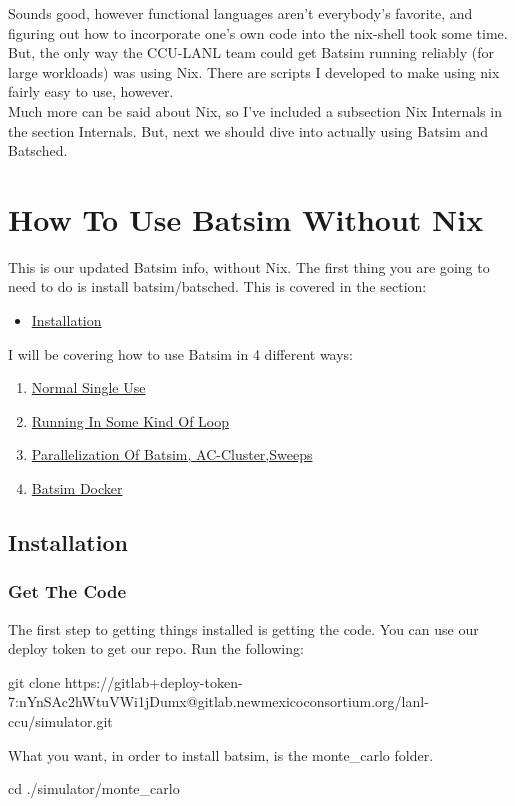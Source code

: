 \documentclass[titlepage]{article}
\let\oldsection\section
\renewcommand\section{\clearpage\oldsection}
\newenvironment{regular}{\color{black}}{}
\begin{document}
\begin{regular}
Sounds good, however functional languages aren't everybody's favorite, and figuring out how to incorporate one's own code into the nix-shell took some time.
But, the only way the CCU-LANL team could get Batsim running reliably (for large workloads) was using Nix.  There are scripts I developed to make using nix
fairly easy to use, however.\\

Much more can be said about Nix, so I've included a subsection Nix Internals in the section Internals.  But, next we should dive into actually using Batsim and Batsched.\\
\end{regular}

\section{How To Use Batsim Without Nix}
\begin{regular}
This is our updated Batsim info, without Nix.  The first thing you are going to need to do is install batsim/batsched.
This is covered in the section:
\begin{itemize}
  \item \hyperlink{how_to_install_batsim_wo_nix}{Installation}
\end{itemize}
I will be covering how to use Batsim in 4 different ways:

\begin{enumerate}
\item \hyperlink{how_to_normal_single_use_wo_nix}{Normal Single Use}
\item \hyperlink{how_to_running_in_loop_wo_nix}{Running In Some Kind Of Loop}
\item \hyperlink{how_to_parallelized_wo_nix}{Parallelization Of Batsim, AC-Cluster,Sweeps}
\item \hyperlink{how_to_docker_wo_nix}{Batsim Docker}
\end{enumerate}
\end{regular}
\subsection{Installation}
\hypertarget{how_to_install_batsim_wo_nix}{}
\subsubsection{Get The Code}
The first step to getting things installed is getting the code.  You can use our deploy token to get our repo.
Run the following:
\begin{terminal}
git clone https://gitlab+deploy-token-7:nYnSAc2hWtuVWi1jDumx@gitlab.newmexicoconsortium.org/lanl-ccu/simulator.git
\end{terminal}
What you want, in order to install batsim, is the monte\_carlo folder.
\begin{terminal}
cd ./simulator/monte_carlo
\end{terminal}
\end{document}

